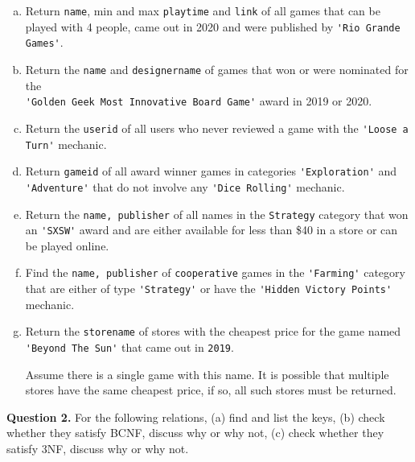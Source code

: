 \documentclass[11pt]{article}
\begin{document}
\begin{enumerate}  [(a)]
\item Return {\tt name}, min and max {\tt playtime} and {\tt link} of
  all games that can be played with 4 people, came out in 2020
  and were published by \verb+'Rio Grande Games'+.

\item Return the {\tt name} and {\tt designername} of games that won
  or were nominated for the \\
  \verb+'Golden Geek Most Innovative Board Game'+ award in 2019 or
  2020.

\item Return the {\tt userid} of all users who never reviewed a game
  with the \verb+'Loose a Turn'+ mechanic.
  
\item Return {\tt gameid} of all award winner games in
  categories \verb+'Exploration'+ and
  \verb+'Adventure'+ that do not involve any \verb+'Dice Rolling'+
  mechanic.

\item Return the {\tt name, publisher} of all names in the
  \verb+Strategy+ category that won an \verb+'SXSW'+ award and are
  either available for less than \$40 in a store or can be played
  online.

\item Find the {\tt name, publisher} of {\tt cooperative} games in
  the \verb+'Farming'+ category that are either of type
  \verb+'Strategy'+ or have the \verb+'Hidden Victory Points'+
  mechanic.

\item Return the {\tt storename} of stores with the cheapest price for
  the game named \verb+'Beyond The Sun'+ that came out in \verb+2019+.

  Assume there is a single game with this name. It is possible that
  multiple stores have the same cheapest price, if so, all such stores
  must be returned.
  
  

\end{enumerate}

{\bf Question 2.} For the following relations, (a) find and list the
keys, (b) check whether they satisfy BCNF, discuss why or why not, (c)
check whether they satisfy 3NF, discuss why or why not.
\end{document}
